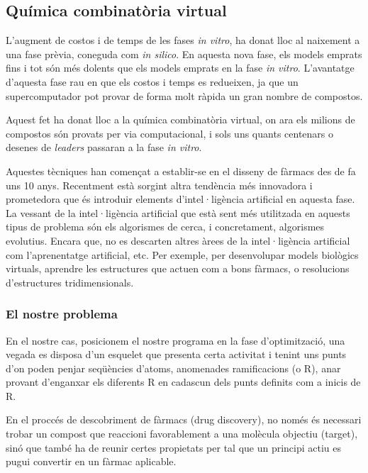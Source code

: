 	\subsection{Química combinatòria virtual}

	L'augment de costos i de temps de les fases \emph{in vitro}, ha donat lloc
	al naixement a una fase prèvia, coneguda com \emph{in silico}. En aquesta
	nova fase, els models emprats fins i tot són més dolents que els models
	emprats en la fase \emph{in vitro}.  L'avantatge d'aquesta fase rau en que
	els costos i temps es redueixen, ja que un supercomputador pot provar de
	forma molt ràpida un gran nombre de compostos.

	Aquest fet ha donat lloc a la química combinatòria virtual, on ara els
	milions de compostos són provats per via computacional, i sols uns quants
	centenars o desenes de \emph{leaders} passaran a la fase \emph{in vitro}.

	Aquestes tècniques han començat a establir-se en el disseny de fàrmacs des
	de fa uns 10 anys. Recentment està sorgint altra tendència més innovadora i
	prometedora que és introduir elements d'intel·ligència artificial en aquesta
	fase. La vessant de la intel·ligència artificial que està sent més
	utilitzada en aquests tipus de problema són els algorismes de cerca, i
	concretament, algorismes evolutius. Encara que, no es descarten altres àrees
	de la intel·ligència artificial com l'aprenentatge artificial, etc.  Per
	exemple, per desenvolupar models biològics virtuals, aprendre les
	estructures que actuen com a bons fàrmacs, o resolucions d'estructures
	tridimensionals. 

\subsubsection{El nostre problema} %

	En el nostre cas, posicionem el nostre programa en la fase d'optimització,
	una vegada es disposa d'un esquelet que presenta certa activitat i tenint
	uns punts d'on poden penjar seqüències d'atoms, anomenades ramificacions (o
	R), anar provant d'enganxar els diferents R en cadascun dels punts definits
	com a inicis de R.

	En el proccés de descobriment de fàrmacs (drug discovery), no només és
	necessari trobar un compost que reaccioni favorablement a una molècula
	objectiu (target), sinó que també ha de reunir certes propietats per tal que
	un principi actiu es pugui convertir en un fàrmac aplicable.  	

